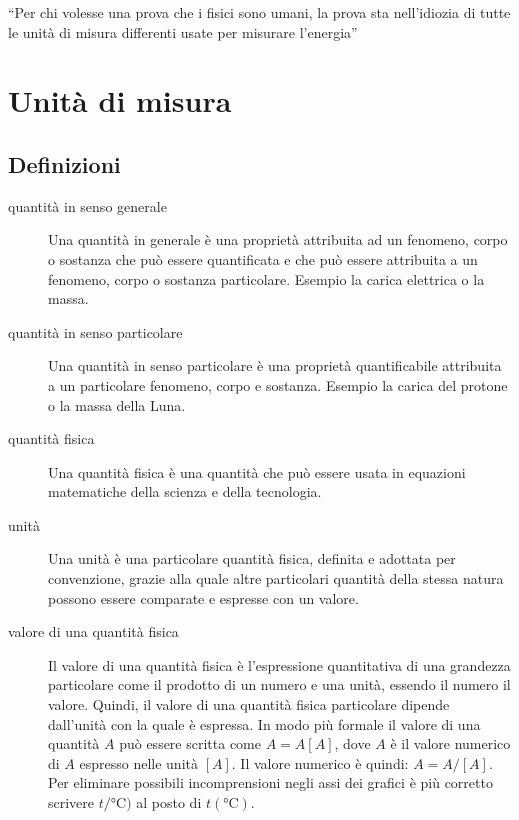 \begin{savequote}[6cm]
``Per chi volesse una prova che i fisici sono umani, la prova sta nell'idiozia di tutte le unità di misura differenti usate per misurare l'energia''
\end{savequote}
\chapter{Unità di misura\label{unita_di_misura_appendice}}
\section{Definizioni}
\begin{description}
\item[quantità in senso generale] Una quantità in generale è una proprietà attribuita ad un fenomeno, corpo o sostanza che può essere quantificata e che può essere attribuita a un fenomeno, corpo o sostanza particolare. Esempio la carica elettrica o la massa.
\item[quantità in senso particolare] Una quantità in senso particolare è una proprietà quantificabile attribuita a un particolare fenomeno, corpo e sostanza. Esempio la carica del protone o la massa della Luna.
\item[quantità fisica] Una quantità fisica è una quantità che può essere usata in equazioni matematiche della scienza e della tecnologia.
\item[unità] Una unità è una particolare quantità fisica, definita e adottata per convenzione, grazie alla quale altre particolari quantità della stessa natura possono essere comparate e espresse con un valore.
\item[valore di una quantità fisica] Il valore di una quantità fisica è l'espressione quantitativa di una grandezza particolare come il prodotto di un numero e una unità, essendo il numero il valore. Quindi, il valore di una quantità fisica particolare dipende dall'unità con la quale è espressa. In modo più formale il valore di una quantità $A$ può essere scritta come $A={A}[A]$, dove ${A}$ è il valore numerico di $A$ espresso nelle unità $[A]$. Il valore numerico è quindi: ${A}=A/[A]$. Per eliminare possibili incomprensioni negli assi dei grafici è più corretto scrivere $t/\si{\celsius})$ al posto di $t(\si{\celsius})$.
\end{description}
